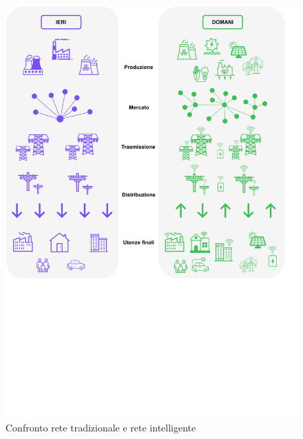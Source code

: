 






\begin{figure}[h!]
    \centering
    \includegraphics[trim= 0cm 28cm 0cm 0cm, clip, width=0.7\linewidth]{img/SM-gray-BG.drawio.pdf}
    \caption{Confronto rete tradizionale e rete intelligente}
    \label{fig:TraditionalGridVSSmartrGrid}
\end{figure}


